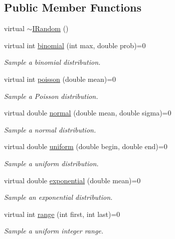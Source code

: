 \subsection*{Public Member Functions}
\begin{DoxyCompactItemize}
\item 
virtual \hyperlink{class_wire_cell_1_1_i_random_a0423914f3cfd21bc8012a9aab26508ed}{$\sim$\+I\+Random} ()
\item 
virtual int \hyperlink{class_wire_cell_1_1_i_random_a4cb94097ddbd0edda3ad891b6d01b37d}{binomial} (int max, double prob)=0
\begin{DoxyCompactList}\small\item\em Sample a binomial distribution. \end{DoxyCompactList}\item 
virtual int \hyperlink{class_wire_cell_1_1_i_random_aae935a94e7a72eccaaf9ad7f1a2fd76a}{poisson} (double mean)=0
\begin{DoxyCompactList}\small\item\em Sample a Poisson distribution. \end{DoxyCompactList}\item 
virtual double \hyperlink{class_wire_cell_1_1_i_random_a6a24d8800300de9f8b735277dc0268d4}{normal} (double mean, double sigma)=0
\begin{DoxyCompactList}\small\item\em Sample a normal distribution. \end{DoxyCompactList}\item 
virtual double \hyperlink{class_wire_cell_1_1_i_random_ac110a2703fe22175c8c074a55a0218a3}{uniform} (double begin, double end)=0
\begin{DoxyCompactList}\small\item\em Sample a uniform distribution. \end{DoxyCompactList}\item 
virtual double \hyperlink{class_wire_cell_1_1_i_random_a093f57116384dacdf0bc68ae4373ae49}{exponential} (double mean)=0
\begin{DoxyCompactList}\small\item\em Sample an exponential distribution. \end{DoxyCompactList}\item 
virtual int \hyperlink{class_wire_cell_1_1_i_random_a936f25425285556c6be01e4e73ea27fd}{range} (int first, int last)=0
\begin{DoxyCompactList}\small\item\em Sample a uniform integer range. \end{DoxyCompactList}\end{DoxyCompactItemize}
